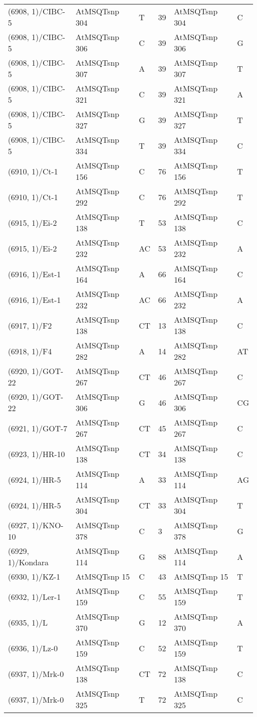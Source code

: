 \begin{center}
\begin{longtable}{|l|l|l|l|l|l|}
(6908, 1)/CIBC-5&AtMSQTsnp 304&T&39&AtMSQTsnp 304&C\\
(6908, 1)/CIBC-5&AtMSQTsnp 306&C&39&AtMSQTsnp 306&G\\
(6908, 1)/CIBC-5&AtMSQTsnp 307&A&39&AtMSQTsnp 307&T\\
(6908, 1)/CIBC-5&AtMSQTsnp 321&C&39&AtMSQTsnp 321&A\\
(6908, 1)/CIBC-5&AtMSQTsnp 327&G&39&AtMSQTsnp 327&T\\
(6908, 1)/CIBC-5&AtMSQTsnp 334&T&39&AtMSQTsnp 334&C\\
(6910, 1)/Ct-1&AtMSQTsnp 156&C&76&AtMSQTsnp 156&T\\
(6910, 1)/Ct-1&AtMSQTsnp 292&C&76&AtMSQTsnp 292&T\\
(6915, 1)/Ei-2&AtMSQTsnp 138&T&53&AtMSQTsnp 138&C\\
(6915, 1)/Ei-2&AtMSQTsnp 232&AC&53&AtMSQTsnp 232&A\\
(6916, 1)/Est-1&AtMSQTsnp 164&A&66&AtMSQTsnp 164&C\\
(6916, 1)/Est-1&AtMSQTsnp 232&AC&66&AtMSQTsnp 232&A\\
(6917, 1)/F2&AtMSQTsnp 138&CT&13&AtMSQTsnp 138&C\\
(6918, 1)/F4&AtMSQTsnp 282&A&14&AtMSQTsnp 282&AT\\
(6920, 1)/GOT-22&AtMSQTsnp 267&CT&46&AtMSQTsnp 267&C\\
(6920, 1)/GOT-22&AtMSQTsnp 306&G&46&AtMSQTsnp 306&CG\\
(6921, 1)/GOT-7&AtMSQTsnp 267&CT&45&AtMSQTsnp 267&C\\
(6923, 1)/HR-10&AtMSQTsnp 138&CT&34&AtMSQTsnp 138&C\\
(6924, 1)/HR-5&AtMSQTsnp 114&A&33&AtMSQTsnp 114&AG\\
(6924, 1)/HR-5&AtMSQTsnp 304&CT&33&AtMSQTsnp 304&T\\
(6927, 1)/KNO-10&AtMSQTsnp 378&C&3&AtMSQTsnp 378&G\\
(6929, 1)/Kondara&AtMSQTsnp 114&G&88&AtMSQTsnp 114&A\\
(6930, 1)/KZ-1&AtMSQTsnp 15&C&43&AtMSQTsnp 15&T\\
(6932, 1)/Ler-1&AtMSQTsnp 159&C&55&AtMSQTsnp 159&T\\
(6935, 1)/L&AtMSQTsnp 370&G&12&AtMSQTsnp 370&A\\
(6936, 1)/Lz-0&AtMSQTsnp 159&C&52&AtMSQTsnp 159&T\\
(6937, 1)/Mrk-0&AtMSQTsnp 138&CT&72&AtMSQTsnp 138&C\\
(6937, 1)/Mrk-0&AtMSQTsnp 325&T&72&AtMSQTsnp 325&C\\

\end{longtable}
\end{center}
